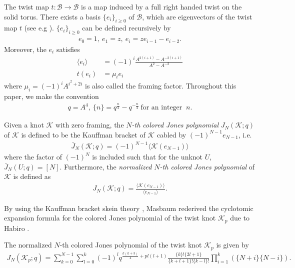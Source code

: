 \documentclass[12pt]{amsart}
\begin{document}
The twist map $t: \mathcal{B}\rightarrow \mathcal{B}$ is a map induced by a full right handed twist on the solid torus. There exists a basis $\{e_i\}_{i\geq 0}$ of $\mathcal{B}$, which are eigenvectors of the twist map $t$ (see e.g \cite{BHMV92}).  $\{e_i\}_{i\geq 0}$ can be defined recursively by 
\begin{align}
    e_0=1, \ e_1=z,  \ e_i=ze_{i-1}-e_{i-2}. 
\end{align}
Moreover, the $e_i$ satisfies
\begin{align}
\langle e_i \rangle&=(-1)^i\frac{A^{2(i+1)}-A^{-2(i+1)}}{A^2-A^{-2}}  \\
t(e_i)&=\mu_i e_i
\end{align}
where $\mu_i=(-1)^iA^{i^2+2i}$ is also called the framing factor. Throughout this paper, we make the  convention  
\begin{align} \label{formula-qconvention}
    q=A^{4}, \ \{n\}=q^{\frac{n}{2}}-q^{-\frac{n}{2}} \ \text{for an integer } \ n. 
\end{align}


\begin{definition}
Given a knot $\mathcal{K}$ with zero framing, the {\em $N$-th colored Jones polynomial} $J_{N}(\mathcal{K};q)$ of $\mathcal{K}$ is defined to be the Kauffman bracket of $\mathcal{K}$ cabled by $(-1)^{N-1}e_{N-1}$, i.e.
\begin{align}
    \bar{J}_{N}(\mathcal{K};q)=(-1)^{N-1}\langle\mathcal{K}(e_{N-1}) \rangle
\end{align}
where the factor of $(-1)^N$ is included such that for the unknot $U$, $\bar{J}_{N}(U;q)=[N]$. Furthermore, the {\em normalized $N$-th colored Jones polynomial} of $\mathcal{K}$ is defined as
\begin{align}
    J_{N}(\mathcal{K};q)=\frac{\langle \mathcal{K}(e_{N-1})\rangle}{\langle e_{N-1}\rangle}.
\end{align}
\end{definition}







By using the Kauffman bracket skein theory \cite{BHMV92,MV94}, Masbaum \cite{Mas03} rederived the cyclotomic expansion formula for the colored Jones polynomial of the twist knot $\mathcal{K}_p$ due to Habiro \cite{Hab08}.    

\begin{proposition}
The normalized $N$-th colored Jones polynomial of the twist knot $\mathcal{K}_p$ is given by 
\begin{align} \label{formula-coloredJonestwist}
J_N(\mathcal{K}_{p};q)=\sum_{k=0}^{N-1}\sum_{l=0}^{k}(-1)^lq^{\frac{k(k+3)}{4}+pl(l+1)}\frac{\{k\}!\{2l+1\}}{\{k+l+1\}!\{k-l\}!}\prod_{i=1}^k(\{N+i\}
\{N-i\}).
\end{align}
\end{proposition}
\end{document}
